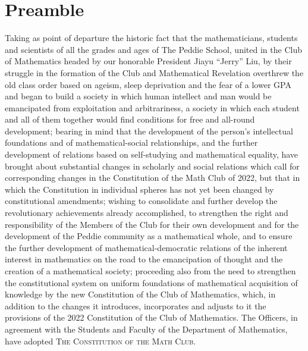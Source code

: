 \documentclass[12pt, letterpaper]{article}
\begin{document}
\fontsize{12pt}{12pt}\selectfont
\setlength{\abovedisplayskip}{0pt}

%
%
%
%

\section*{Preamble}
Taking as point of departure the historic fact that the mathematicians, students and scientists of all the grades and ages of The Peddie School, united in the Club of Mathematics headed by our honorable President Jiayu “Jerry” Liu, by their struggle in the formation of the Club and Mathematical Revelation overthrew the old class order based on ageism, sleep deprivation and the fear of a lower GPA and began to build a society in which human intellect and man would be emancipated from exploitation and arbitrariness, a society in which each student and all of them together would find conditions for free and all-round development; bearing in mind that the development of the person’s intellectual foundations and of mathematical-social relationships, and the further development of relations based on self-studying and mathematical equality, have brought about substantial changes in scholarly and social relations which call for corresponding changes in the Constitution of the Math Club of 2022, but that in which the Constitution in individual spheres has not yet been changed by constitutional amendments; wishing to consolidate and further develop the revolutionary achievements already accomplished, to strengthen the right and responsibility of the Members of the Club for their own development and for the development of the Peddie community as a mathematical whole, and to ensure the further development of mathematical-democratic relations of the inherent interest in mathematics on the road to the emancipation of thought and the creation of a mathematical society; proceeding also from the need to strengthen the constitutional system on uniform foundations of mathematical acquisition of knowledge by the new Constitution of the Club of Mathematics, which, in addition to the changes it introduces, incorporates and adjusts to it the provisions of the 2022 Constitution of the Club of Mathematics. The Officers, in agreement with the Students and Faculty of the Department of Mathematics, have adopted \textsc{\large The Constitution of the Math Club}.
\end{document}
